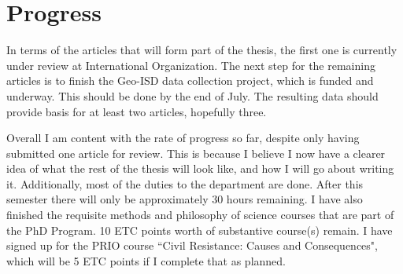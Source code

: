 \documentclass[12pt]{article}
\begin{document}



\section{Progress}

In terms of the articles that will form part of the thesis, the first one is 
currently under review at International Organization.
The next step for the remaining articles is to finish the Geo-ISD data 
collection project, which is funded and underway.
This should be done by the end of July.
The resulting data should provide basis for at least two articles, hopefully 
three.

Overall I am content with the rate of progress so far, despite only having 
submitted one article for review.
This is because I believe I now have a clearer idea of what the rest of the 
thesis will look like, and how I will go about writing it.
Additionally, most of the duties to the department are done.
After this semester there will only be approximately 30 hours remaining.
I have also finished the requisite methods and philosophy of science courses 
that are part of the PhD Program.
10 ETC points worth of substantive course(s) remain.
I have signed up for the PRIO course ``Civil Resistance: Causes and 
Consequences", which will be 5 ETC points if I complete that as planned.


\pagebreak


\end{document}
